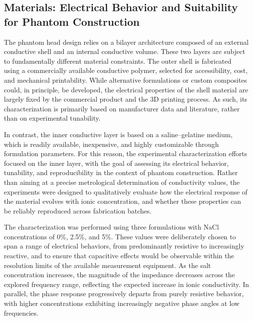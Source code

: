\subsection{Materials: Electrical Behavior and Suitability for Phantom Construction}

The phantom head design relies on a bilayer architecture composed of an external conductive
shell and an internal conductive volume. These two layers are subject to fundamentally
different material constraints. The outer shell is fabricated using a commercially
available conductive polymer, selected for accessibility, cost, and mechanical
printability. While alternative formulations or custom composites could, in principle, be
developed, the electrical properties of the shell material are largely fixed by the
commercial product and the 3D printing process. As such, its characterization is primarily
based on manufacturer data and literature, rather than on experimental tunability.

In contrast, the inner conductive layer is based on a saline--gelatine medium, which is
readily available, inexpensive, and highly customizable through formulation parameters.
For this reason, the experimental characterization efforts focused on the inner layer, with
the goal of assessing its electrical behavior, tunability, and reproducibility in the
context of phantom construction. Rather than aiming at a precise metrological determination
of conductivity values, the experiments were designed to qualitatively evaluate how the
electrical response of the material evolves with ionic concentration, and whether these
properties can be reliably reproduced across fabrication batches.

The characterization was performed using three formulations with NaCl concentrations of
0\%, 2.5\%, and 5\%. These values were deliberately chosen to span a range of electrical
behaviors, from predominantly resistive to increasingly reactive, and to ensure that
capacitive effects would be observable within the resolution limits of the available
measurement equipment. As the salt concentration increases, the magnitude of the impedance
decreases across the explored frequency range, reflecting the expected increase in ionic
conductivity. In parallel, the phase response progressively departs from purely resistive
behavior, with higher concentrations exhibiting increasingly negative phase angles at low
frequencies.

